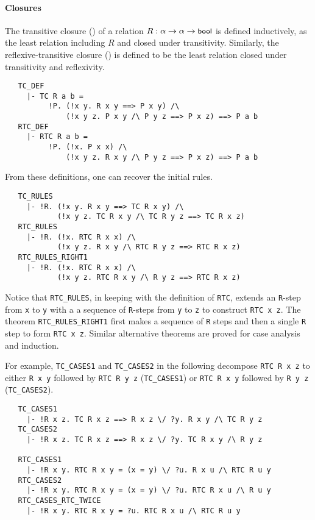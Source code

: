 \paragraph {Closures}

The transitive closure () of a relation $R : \alpha
\to\alpha\to\mbox{\small{\textbf{\sf{bool}}}}$ is defined inductively, as the least
relation including $R$ and closed under transitivity. Similarly, the
reflexive-transitive closure () is defined to be the least
relation closed under transitivity and reflexivity.
%
\begin{hol}
\begin{verbatim}
   TC_DEF
     |- TC R a b =
          !P. (!x y. R x y ==> P x y) /\
              (!x y z. P x y /\ P y z ==> P x z) ==> P a b
   RTC_DEF
     |- RTC R a b =
          !P. (!x. P x x) /\
              (!x y z. R x y /\ P y z ==> P x z) ==> P a b
\end{verbatim}
\end{hol}

\noindent
From these definitions, one can recover the initial rules.
%
\begin{hol}
\begin{verbatim}
   TC_RULES
     |- !R. (!x y. R x y ==> TC R x y) /\
            (!x y z. TC R x y /\ TC R y z ==> TC R x z)
   RTC_RULES
     |- !R. (!x. RTC R x x) /\
            (!x y z. R x y /\ RTC R y z ==> RTC R x z)
   RTC_RULES_RIGHT1
     |- !R. (!x. RTC R x x) /\
            (!x y z. RTC R x y /\ R y z ==> RTC R x z)
\end{verbatim}
\end{hol}
%
Notice that {\small\verb+RTC_RULES+}, in keeping with the definition
of {\small\verb+RTC+}, extends an \verb+R+-step from \verb+x+ to
\verb+y+ with a a sequence of \verb+R+-steps from \verb+y+ to \verb+z+
to construct \verb+RTC x z+. The theorem
{\small\verb+RTC_RULES_RIGHT1+} first makes a sequence of \verb+R+
steps and then a single \verb+R+ step to form \verb+RTC x z+. Similar
alternative theorems are proved for case analysis and induction.

For example, {\small\verb+TC_CASES1+} and {\small\verb+TC_CASES2+} in the
following decompose {\small\verb+RTC R x z+} to either
{\small\verb+R x y+} followed by {\small\verb+RTC R y z+}
({\small\verb+TC_CASES1+})
or
{\small\verb+RTC R x y+} followed by {\small\verb+R y z+}
({\small\verb+TC_CASES2+}).

%
\begin{hol}
\begin{verbatim}
   TC_CASES1
     |- !R x z. TC R x z ==> R x z \/ ?y. R x y /\ TC R y z
   TC_CASES2
     |- !R x z. TC R x z ==> R x z \/ ?y. TC R x y /\ R y z

   RTC_CASES1
     |- !R x y. RTC R x y = (x = y) \/ ?u. R x u /\ RTC R u y
   RTC_CASES2
     |- !R x y. RTC R x y = (x = y) \/ ?u. RTC R x u /\ R u y
   RTC_CASES_RTC_TWICE
     |- !R x y. RTC R x y = ?u. RTC R x u /\ RTC R u y
\end{verbatim}
\end{hol}


